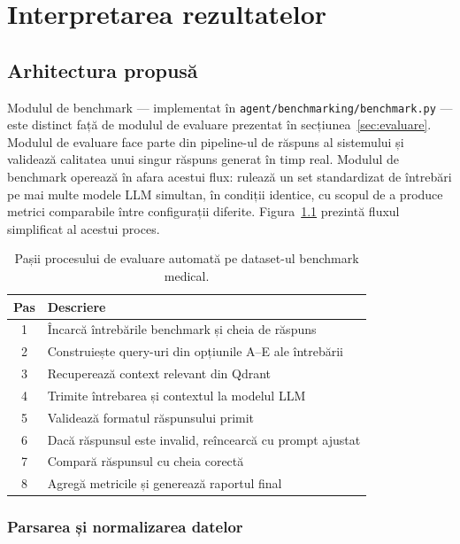 \documentclass[12pt, a4paper, oneside, romanian]{teza-upb}
\begin{document}
\chapter{Interpretarea rezultatelor}

\section{Arhitectura propusă}

Modulul de benchmark --- implementat în \texttt{agent/benchmarking/benchmark.py} --- este distinct față de modulul de evaluare prezentat în secțiunea~\ref{sec:evaluare}. Modulul de evaluare face parte din pipeline-ul de răspuns al sistemului și validează calitatea unui singur răspuns generat în timp real. Modulul de benchmark operează în afara acestui flux: rulează un set standardizat de întrebări pe mai multe modele LLM simultan, în condiții identice, cu scopul de a produce metrici comparabile între configurații diferite. Figura~\ref{tab:benchmark_steps} prezintă fluxul simplificat al acestui proces.


\begin{table}[H]
\centering
\begin{tabular}{cl}
\toprule
\textbf{Pas} & \textbf{Descriere} \\
\midrule
1 & Încarcă întrebările benchmark și cheia de răspuns \\
2 & Construiește query-uri din opțiunile A--E ale întrebării \\
3 & Recuperează context relevant din Qdrant \\
4 & Trimite întrebarea și contextul la modelul LLM \\
5 & Validează formatul răspunsului primit \\
6 & Dacă răspunsul este invalid, reîncearcă cu prompt ajustat \\
7 & Compară răspunsul cu cheia corectă \\
8 & Agregă metricile și generează raportul final \\
\bottomrule
\end{tabular}
\caption{Pașii procesului de evaluare automată pe dataset-ul benchmark medical.}
\label{tab:benchmark_steps}
\end{table}


\subsection{Parsarea și normalizarea datelor}
\end{document}
